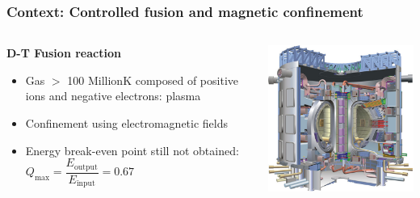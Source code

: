 \documentclass[10pt]{beamer}
\begin{document}
\begin{frame}
\frametitle{Context: Controlled fusion and magnetic confinement}
    
\begin{columns}
    	\begin{column}{0.65\textwidth}
    	    	\begin{center}
		\textbf{D-T Fusion reaction\;\;\;}\vspace{0.3cm}
    		\resizebox{0.5\textwidth}{!}{}       
    		\end{center}
    		\vspace{-0.5cm}
		\begin{itemize}%
    			\item Gas $>$ 100 Million\degree K composed of positive ions and negative electrons: plasma
    			\item Confinement using electromagnetic fields
			\item Energy break-even point still not obtained: $Q_{\text{max}} = \dfrac{E_\text{output}}{E_\text{input}}  =0.67$
		\end{itemize}

    	\end{column}
    	
    	\begin{column}{0.35\textwidth}
	\includegraphics[width=1.\textwidth]{figures/ITER.pdf}
    	\end{column}
    	

\end{columns}
\end{frame}
\end{document}
